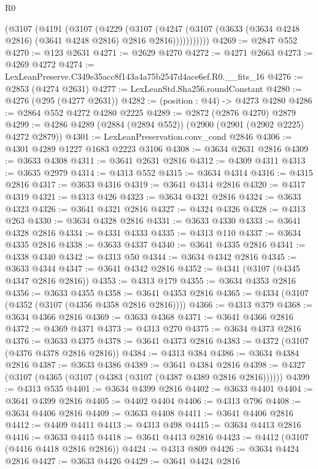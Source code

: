 \begin{lexlean}{R0}
\begin{coremodule}
          (@3107
            (@4191
              (@3107
                (@4229
                  (@3107
                    (@4247
                      (@3107 (@3633 (@3634 @4248 @2816) (@3641 @4248 @2816) @2816 @2816)))))))))))
@4269 := @2847 @552
@4270 := @123 @2631
@4271 := @2629 @4270
@4272 := @4271 @2663
@4273 := @4269 @4272
@4274 := LexLeanPreserve.C349e35acc8f143a4a75b2547d4ace6ef.R0.__fits_16
@4276 := @2853 (@4274 @2631)
@4277 := LexLeanStd.Sha256.roundConstant
@4280 := @4276 (@295 (@4277 @2631))
@4282 := (position : @44) -> @4273 @4280
@4286 := @2864 @552 @4272 @4280 @2225
@4289 := @2872 (@2876 @4270) @2879
@4299 := @4286 @4289 (@2884 (@2894 @552)) (@2900 (@2901 (@2902 @2225) @4272 @2879))
@4301 := LexLeanPreservation.conv_cond @2846
@4306 := @4301 @4289 @1227 @1683 @2223 @3106
@4308 := @3634 @2631 @2816
@4309 := @3633 @4308
@4311 := @3641 @2631 @2816
@4312 := @4309 @4311
@4313 := @3635 @2979
@4314 := @4313 @552
@4315 := @3634 @4314
@4316 := @4315 @2816
@4317 := @3633 @4316
@4319 := @3641 @4314 @2816
@4320 := @4317 @4319
@4321 := @4313 @426
@4323 := @3634 @4321 @2816
@4324 := @3633 @4323
@4326 := @3641 @4321 @2816
@4327 := @4324 @4326
@4328 := @4313 @263
@4330 := @3634 @4328 @2816
@4331 := @3633 @4330
@4333 := @3641 @4328 @2816
@4334 := @4331 @4333
@4335 := @4313 @110
@4337 := @3634 @4335 @2816
@4338 := @3633 @4337
@4340 := @3641 @4335 @2816
@4341 := @4338 @4340
@4342 := @4313 @50
@4344 := @3634 @4342 @2816
@4345 := @3633 @4344
@4347 := @3641 @4342 @2816
@4352 := @4341 (@3107 (@4345 @4347 @2816 @2816))
@4353 := @4313 @179
@4355 := @3634 @4353 @2816
@4356 := @3633 @4355
@4358 := @3641 @4353 @2816
@4365 := @4334 (@3107 (@4352 (@3107 (@4356 @4358 @2816 @2816))))
@4366 := @4313 @379
@4368 := @3634 @4366 @2816
@4369 := @3633 @4368
@4371 := @3641 @4366 @2816
@4372 := @4369 @4371
@4373 := @4313 @270
@4375 := @3634 @4373 @2816
@4376 := @3633 @4375
@4378 := @3641 @4373 @2816
@4383 := @4372 (@3107 (@4376 @4378 @2816 @2816))
@4384 := @4313 @384
@4386 := @3634 @4384 @2816
@4387 := @3633 @4386
@4389 := @3641 @4384 @2816
@4398 := @4327 (@3107 (@4365 (@3107 (@4383 (@3107 (@4387 @4389 @2816 @2816))))))
@4399 := @4313 @535
@4401 := @3634 @4399 @2816
@4402 := @3633 @4401
@4404 := @3641 @4399 @2816
@4405 := @4402 @4404
@4406 := @4313 @796
@4408 := @3634 @4406 @2816
@4409 := @3633 @4408
@4411 := @3641 @4406 @2816
@4412 := @4409 @4411
@4413 := @4313 @498
@4415 := @3634 @4413 @2816
@4416 := @3633 @4415
@4418 := @3641 @4413 @2816
@4423 := @4412 (@3107 (@4416 @4418 @2816 @2816))
@4424 := @4313 @809
@4426 := @3634 @4424 @2816
@4427 := @3633 @4426
@4429 := @3641 @4424 @2816

\end{coremodule}
\end{lexlean}
